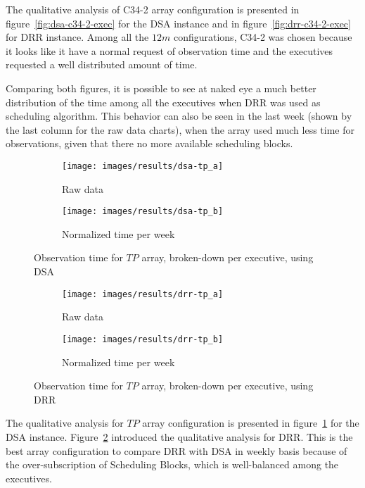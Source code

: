 The qualitative analysis of C34-2 array configuration is presented in figure~\ref{fig:dsa-c34-2-exec} for the DSA instance and in figure~\ref{fig:drr-c34-2-exec} for DRR instance. Among all the $12m$ configurations, C34-2 was chosen because it looks like it have a normal request of observation time and the executives requested a well distributed amount of time. 

Comparing both figures, it is possible to see at naked eye a much better distribution of the time among all the executives when DRR was used as scheduling algorithm. This behavior can also be seen in the last week (shown by the last column for the raw data charts), when the array used much less time for observations, given that there no more available scheduling blocks.

\begin{figure}[t]
\centering
	\begin{subfigure}[b]{0.49\textwidth}
		\texttt{[image: images/results/dsa-tp\_a]}
        \caption{Raw data} 
    \end{subfigure} 
    \begin{subfigure}[b]{0.49\textwidth}
    		\texttt{[image: images/results/dsa-tp\_b]}
            \caption{Normalized time per week} 
    \end{subfigure}
    \caption{Observation time for $TP$ array, broken-down per executive, using DSA}
    \label{fig:dsa-tp-exec}
\end{figure}

\begin{figure}[t]
\centering
	\begin{subfigure}[b]{0.49\textwidth}
		\texttt{[image: images/results/drr-tp\_a]}
        \caption{Raw data} 
    \end{subfigure} 
    \begin{subfigure}[b]{0.49\textwidth}
    		\texttt{[image: images/results/drr-tp\_b]}
            \caption{Normalized time per week} 
    \end{subfigure}
    \caption{Observation time for $TP$ array, broken-down per executive, using DRR}
    \label{fig:drr-tp-exec}
\end{figure}

The qualitative analysis for $TP$ array configuration is presented in figure~\ref{fig:dsa-tp-exec} for the DSA instance. Figure~\ref{fig:drr-tp-exec} introduced the qualitative analysis for DRR. This is the best array configuration to compare DRR with DSA in weekly basis because of the over-subscription of Scheduling Blocks, which is well-balanced among the executives.

